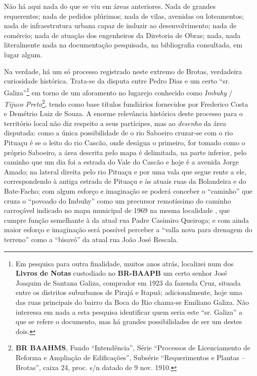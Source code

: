 



Não há aqui nada do que se viu em áreas anteriores. Nada de grandes requerentes; nada de pedidos plúrimos; nada de vilas, avenidas ou loteamentos; nada de infraestrutura urbana capaz de induzir ao desenvolvimento; nada de comércio; nada de atuação dos engenheiros da Diretoria de Obras; nada, nada literalmente nada na documentação pesquisada, na bibliografia consultada, em lugar algum. 

Na verdade, há um só processo registrado neste extremo de Brotas, verdadeira curiosidade histórica. Trata-se da disputa entre Pedro Dias e um certo ``sr. Galiza''\footnote{Em pesquisa para outra finalidade, muitos anos atrás, localizei num dos \textbf{Livros de Notas} custodiado no \textbf{BR-BAAPB} um certo senhor José Joaquim de Santana Galiza, comprador em 1923 da fazenda Cruz, situada entre os distritos suburbanos de Pirajá e Itapuã; adicionalmente, hoje uma das ruas principais do bairro da Boca do Rio chama-se Emiliano Galiza. Não interessa em nada a esta pesquisa identificar quem seria este ``sr. Galiza'' a que se refere o documento, mas há grandes possibilidades de ser um destes dois.} em torno de um aforamento no lugarejo conhecido como \textit{Imbuhy} / \textit{Tijuco Preto}\footnote{\textbf{BR BAAHMS}, Fundo ``Intendência'', Série ``Processos de Licenciamento de Reforma e Ampliação de Edificações'', Subsérie ``Requerimentos e Plantas -- Brotas'', caixa 24, proc. s/n datado de 9 nov. 1910.}, tendo como base títulos fundiários fornecidos por Frederico Costa e Demétrio Luiz de Souza. A enorme relevância histórica deste processo para o território local não diz respeito a seus partícipes, mas ao \textit{desenho} da área disputada: como a única possibilidade de o rio Saboeiro cruzar-se com o rio Pituaçu é se o leito do rio Cascão, onde deságua o primeiro, for tomado como o próprio Saboeiro, a área descrita pelo mapa é delimitada, na parte inferior, pelo caminho que um dia foi a estrada do Vale do Cascão \cite{salvador_mapa_1969} e hoje é a avenida Jorge Amado; na lateral direita pelo rio Pituaçu e por uma vala que segue rente a ele, correspondendo à antiga estrada de Pituaçu \cite{salvador_mapa_1969} e às atuais ruas da Bolandeira e do Bate-Facho; com algum esforço e imaginação se poderá conceber o ``caminho'' que cruza o ``povoado do Imbuhy'' como um precursor remotíssimo do caminho carroçável indicado no mapa municipal de 1969 na mesma localidade \cite{salvador_mapa_1969}, que cumpre função semelhante à da atual rua Padre Casimiro Queiroga; e com ainda maior esforço e imaginação será possível perceber a ``valla nova para drenagem do terreno'' como a ``bisavó'' da atual rua João José Rescala. 

